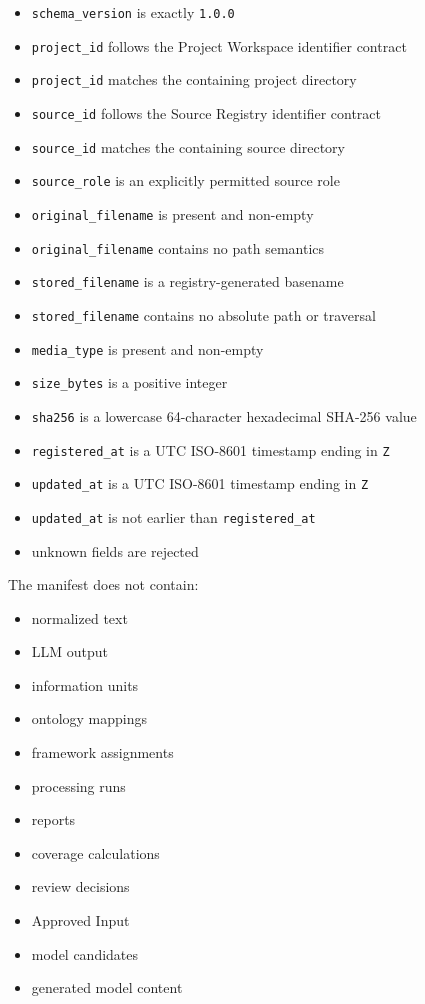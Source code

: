 \begin{itemize}
\tightlist
\item
  \texttt{schema\_version} is exactly \texttt{1.0.0}
\item
  \texttt{project\_id} follows the Project Workspace identifier contract
\item
  \texttt{project\_id} matches the containing project directory
\item
  \texttt{source\_id} follows the Source Registry identifier contract
\item
  \texttt{source\_id} matches the containing source directory
\item
  \texttt{source\_role} is an explicitly permitted source role
\item
  \texttt{original\_filename} is present and non-empty
\item
  \texttt{original\_filename} contains no path semantics
\item
  \texttt{stored\_filename} is a registry-generated basename
\item
  \texttt{stored\_filename} contains no absolute path or traversal
\item
  \texttt{media\_type} is present and non-empty
\item
  \texttt{size\_bytes} is a positive integer
\item
  \texttt{sha256} is a lowercase 64-character hexadecimal SHA-256 value
\item
  \texttt{registered\_at} is a UTC ISO-8601 timestamp ending in \texttt{Z}
\item
  \texttt{updated\_at} is a UTC ISO-8601 timestamp ending in \texttt{Z}
\item
  \texttt{updated\_at} is not earlier than \texttt{registered\_at}
\item
  unknown fields are rejected
\end{itemize}

The manifest does not contain:

\begin{itemize}
\tightlist
\item
  normalized text
\item
  LLM output
\item
  information units
\item
  ontology mappings
\item
  framework assignments
\item
  processing runs
\item
  reports
\item
  coverage calculations
\item
  review decisions
\item
  Approved Input
\item
  model candidates
\item
  generated model content
\end{itemize}

